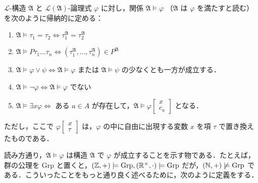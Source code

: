 \documentclass[a4j]{jsarticle}
\begin{document}
\begin{definition}[充足関係]
 $\mathcal{L}$-構造 $\mathfrak{A}$ と $\mathcal{L}(\mathfrak{A})$-論理式 $\varphi$ に対し，関係 $\mathfrak{A} \models \varphi$ （$\mathfrak{A}$ は $\varphi$ を満たすと読む）を次のように帰納的に定める：
 \begin{enumerate}
  \item $\mathfrak{A} \models \tau_1 = \tau_2 \Longleftrightarrow \tau_1^\mathfrak{A} = \tau_2^\mathfrak{A}$
  \item $\mathfrak{A} \models P\tau_1 \dots \tau_n \Longleftrightarrow (\tau_1^\mathfrak{A}, \dots, \tau_n^\mathfrak{A}) \in P^\mathfrak{A}$
  \item $\mathfrak{A} \models \varphi \vee \psi \Longleftrightarrow \mathfrak{A} \models \varphi$ または $\mathfrak{A} \models \psi$ の少なくとも一方が成立する．
  \item $\mathfrak{A} \models \neg \varphi \Longleftrightarrow \mathfrak{A} \models \varphi$ でない
  \item $\mathfrak{A} \models \exists x \varphi \Longleftrightarrow$ ある $a \in A$ が存在して，$\mathfrak{A} \models \varphi[\begin{smallmatrix}x\\c_a\end{smallmatrix}]$ となる．
 \end{enumerate}
 ただし，ここで $\varphi[\begin{smallmatrix}x\\\tau\end{smallmatrix}]$ は，$\varphi$ の中に自由に出現する変数 $x$ を項 $\tau$ で置き換えたものである．
\end{definition}

読み方通り，$\mathfrak{A} \models \varphi$ は構造 $\mathfrak{A}$ で $\varphi$ が成立することを示す物である．たとえば，群の公理を $\mathrm{Grp}$ と置くと，$(\mathbb{Z}, +) \models \mathrm{Grp}, (\mathbb{R}^\times, \cdot) \models \mathrm{Grp}$ だが，$(\mathbb{N}, +) \not\models \mathrm{Grp}$ である．こういったことをもっと通り良く述べるために，次のように定義をする．
\end{document}
